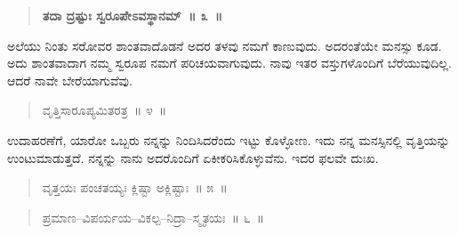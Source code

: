 \vspace{-0.2cm}

\begin{verse}
\textbf{ತದಾ ದ್ರಷ್ಟುಃ ಸ್ವರೂಪೇಽವಸ್ಥಾನಮ್​~॥ ೩~॥}
\end{verse}

\vspace{-0.3cm}


\vspace{0.1cm}

ಅಲೆಯು ನಿಂತು ಸರೋವರ ಶಾಂತವಾದೊಡನೆ ಅದರ ತಳವು ನಮಗೆ ಕಾಣುವುದು. ಅದರಂತೆಯೇ ಮನಸ್ಸು ಕೂಡ. ಅದು ಶಾಂತವಾದಾಗ ನಮ್ಮ ಸ್ವರೂಪ ನಮಗೆ ಪರಿಚಯವಾಗುವುದು. ನಾವು ಇತರ ವಸ್ತುಗಳೊಂದಿಗೆ ಬೆರೆಯುವುದಿಲ್ಲ. ಆದರೆ ನಾವೇ ಬೇರೆಯಾಗುವೆವು. 

\vspace{-0.2cm}

\begin{verse}
ವೃತ್ತಿಸಾರೂಪ್ಯಮಿತರತ್ರ~॥ ೪~॥
\end{verse}

\vspace{-0.3cm}


\vspace{0.1cm}

ಉದಾಹರಣೆಗೆ, ಯಾರೋ ಒಬ್ಬರು ನನ್ನನ್ನು ನಿಂದಿಸಿದರೆಂದು ಇಟ್ಟು ಕೊಳ್ಳೋಣ. ಇದು ನನ್ನ ಮನಸ್ಸಿನಲ್ಲಿ ವೃತ್ತಿಯನ್ನು ಉಂಟುಮಾಡುತ್ತದೆ. ನನ್ನನ್ನು ನಾನು ಅದರೊಂದಿಗೆ ಏಕೀಕರಿಸಿಕೊಳ್ಳುವೆನು. ಇದರ ಫಲವೇ ದುಃಖ. 

\vspace{-0.2cm}

\begin{verse}
ವೃತ್ತಯಃ ಪಂಚತಯ್ಯಃ ಕ್ಲಿಷ್ಟಾ ಅಕ್ಲಿಷ್ಟಾಃ~॥ ೫~॥
\end{verse}

\vspace{-0.3cm}


\vspace{-0.1cm}

\begin{verse}
ಪ್ರಮಾಣ–ವಿಪರ್ಯಯ–ವಿಕಲ್ಪ–ನಿದ್ರಾ–ಸ್ಮೃತಯಃ~॥ ೬~॥
\end{verse}

\vspace{-0.3cm}


